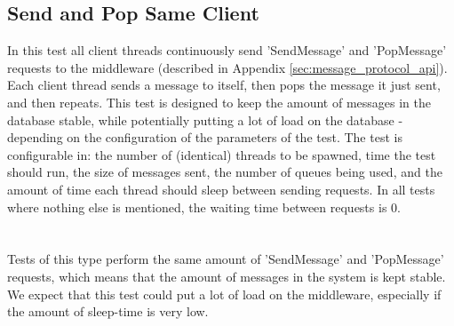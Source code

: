 \documentclass{article}
\begin{document}
        \subsection{Send and Pop Same Client}
            In this test all client threads continuously send 'SendMessage' and 'PopMessage' requests to the middleware (described in Appendix \ref{sec:message_protocol_api}). Each client thread sends a message to itself, then pops the message it just sent, and then repeats. This test is designed to keep the amount of messages in the database stable, while potentially putting a lot of load on the database - depending on the configuration of the parameters of the test. The test is configurable in: the number of (identical) threads to be spawned, time the test should run, the size of messages sent, the number of queues being used, and the amount of time each thread should sleep between sending requests. In all tests where nothing else is mentioned, the waiting time between requests is 0.\\
            \\
            \\
            Tests of this type perform the same amount of 'SendMessage' and 'PopMessage' requests, which means that the amount of messages in the system is kept stable. We expect that this test could put a lot of load on the middleware, especially if the amount of sleep-time is very low.
\end{document}
